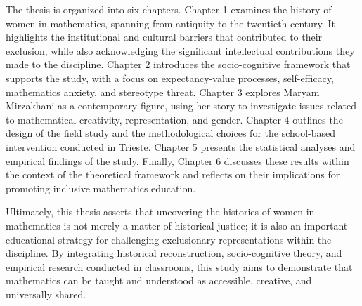 The thesis is organized into six chapters. Chapter 1 examines the history of women in mathematics, spanning from antiquity to the twentieth century. It highlights the institutional and cultural barriers that contributed to their exclusion, while also acknowledging the significant intellectual contributions they made to the discipline. Chapter 2 introduces the socio-cognitive framework that supports the study, with a focus on expectancy-value processes, self-efficacy, mathematics anxiety, and stereotype threat. Chapter 3 explores Maryam Mirzakhani as a contemporary figure, using her story to investigate issues related to mathematical creativity, representation, and gender. Chapter 4 outlines the design of the field study and the methodological choices for the school-based intervention conducted in Trieste. Chapter 5 presents the statistical analyses and empirical findings of the study. Finally, Chapter 6 discusses these results within the context of the theoretical framework and reflects on their implications for promoting inclusive mathematics education.

Ultimately, this thesis asserts that uncovering the histories of women in mathematics is not merely a matter of historical justice; it is also an important educational strategy for challenging exclusionary representations within the discipline. By integrating historical reconstruction, socio-cognitive theory, and empirical research conducted in classrooms, this study aims to demonstrate that mathematics can be taught and understood as accessible, creative, and universally shared.